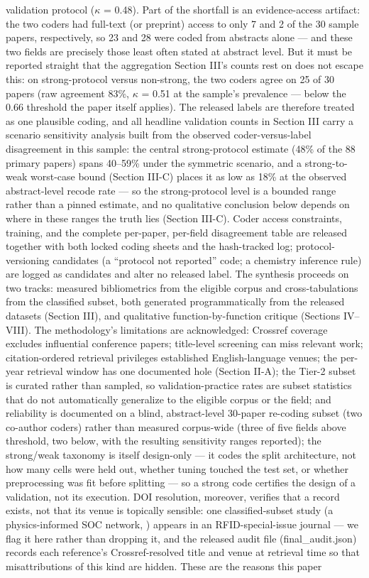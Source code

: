 \documentclass[journal]{IEEEtran}
\begin{document}
validation protocol ($\kappa$ = 0.48). Part of the shortfall is an evidence-access artifact: the two coders had full-text (or preprint) access to only 7 and 2 of the 30 sample papers, respectively, so 23 and 28 were coded from abstracts alone --- and these two fields are precisely those least often stated at abstract level. But it must be reported straight that the aggregation Section III's counts rest on does not escape this: on strong-protocol versus non-strong, the two coders agree on 25 of 30 papers (raw agreement 83\%, $\kappa$ = 0.51 at the sample's prevalence --- below the 0.66 threshold the paper itself applies). The released labels are therefore treated as one plausible coding, and all headline validation counts in Section III carry a scenario sensitivity analysis built from the observed coder-versus-label disagreement in this sample: the central strong-protocol estimate (48\% of the 88 primary papers) spans 40--59\% under the symmetric scenario, and a strong-to-weak worst-case bound (Section III-C) places it as low as 18\% at the observed abstract-level recode rate --- so the strong-protocol level is a bounded range rather than a pinned estimate, and no qualitative conclusion below depends on where in these ranges the truth lies (Section III-C). Coder access constraints, training, and the complete per-paper, per-field disagreement table are released together with both locked coding sheets and the hash-tracked log; protocol-versioning candidates (a ``protocol not reported'' code; a chemistry inference rule) are logged as candidates and alter no released label. The synthesis proceeds on two tracks: measured bibliometrics from the eligible corpus and cross-tabulations from the classified subset, both generated programmatically from the released datasets (Section III), and qualitative function-by-function critique (Sections IV--VIII). The methodology's limitations are acknowledged: Crossref coverage excludes influential conference papers; title-level screening can miss relevant work; citation-ordered retrieval privileges established English-language venues; the per-year retrieval window has one documented hole (Section II-A); the Tier-2 subset is curated rather than sampled, so validation-practice rates are subset statistics that do not automatically generalize to the eligible corpus or the field; and reliability is documented on a blind, abstract-level 30-paper re-coding subset (two co-author coders) rather than measured corpus-wide (three of five fields above threshold, two below, with the resulting sensitivity ranges reported); the strong/weak taxonomy is itself design-only --- it codes the split architecture, not how many cells were held out, whether tuning touched the test set, or whether preprocessing was fit before splitting --- so a strong code certifies the design of a validation, not its execution. DOI resolution, moreover, verifies that a record exists, not that its venue is topically sensible: one classified-subset study (a physics-informed SOC network, \cite{r10}) appears in an RFID-special-issue journal --- we flag it here rather than dropping it, and the released audit file (final\_audit.json) records each reference's Crossref-resolved title and venue at retrieval time so that misattributions of this kind are hidden. These are the reasons this paper 
\end{document}
